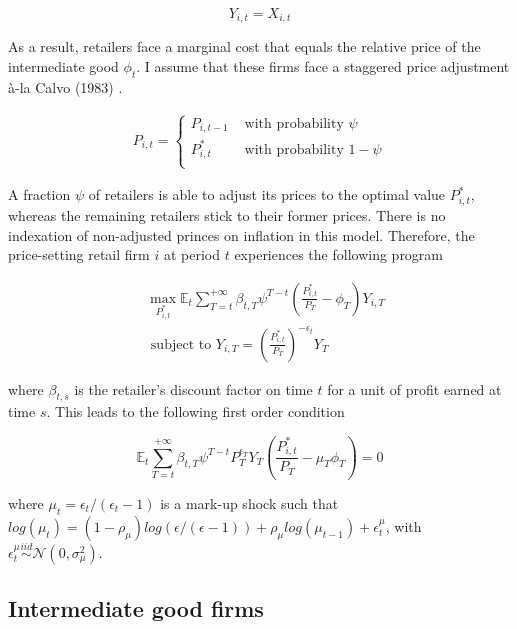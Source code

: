 \documentclass[a4paper]{article}
\begin{document}
\begin{equation*}
Y_{i,t} = X_{i,t}
\end{equation*}

As a result, retailers face a marginal cost that equals the relative price of the intermediate good $\phi_t$. I assume that these firms face a staggered price adjustment à-la Calvo (1983) \cite{calvo1983staggered}.

\begin{align*}
P_{i,t} = \left\{ \begin{array}{ll}
P_{i,t-1} & \text{ with probability } \psi\\
P_{i,t}^* & \text{ with probability } 1-\psi\\
\end{array}
\right.
\end{align*}

A fraction $\psi$ of retailers is able to adjust its prices to the optimal value $P_{i,t}^*$, whereas the  remaining retailers stick to their former prices. There is no indexation of non-adjusted princes on inflation in this model. Therefore, the price-setting retail firm $i$ at period $t$ experiences the following program

\begin{align*}
&\max_{P_{i,t}^*} \mathbb{E}_{t} \sum_{T = t}^{+\infty} \beta_{t,T} \psi^{T-t} \left( \frac{P_{i,t}^*}{P_T} - \phi_{T} \right) Y_{i,T} \\
&\text{ subject to } Y_{i,T} = \left( \frac{P_{i,t}^*}{P_T} \right)^{-\epsilon_t} Y_T
\end{align*}

where $\beta_{t,s}$ is the retailer's discount factor on time $t$ for a unit of profit earned at time $s$. This leads to the following first order condition

\begin{equation}
\mathbb{E}_{t} \sum_{T = t}^{+\infty} \beta_{t,T} \psi^{T-t} P_T^{\epsilon_T} Y_T \left( \frac{P_{i,t}^*}{P_T} - \mu_T \phi_T \right) = 0 \label{price_eq}
\end{equation}

where $\mu_t = \epsilon_t /(\epsilon_t-1)$ is a mark-up shock such that $log\left( \mu_t \right) = \left(1-\rho_\mu\right) log\left( \epsilon / (\epsilon - 1) \right) + \rho_\mu log \left( \mu_{t-1} \right) + \epsilon_t^{\mu}$, with $\epsilon_t^{\mu} \overset{iid}{\sim} \mathcal{N} \left(0, \sigma_\mu^2 \right)$.

\subsection{Intermediate good firms}
\end{document}

